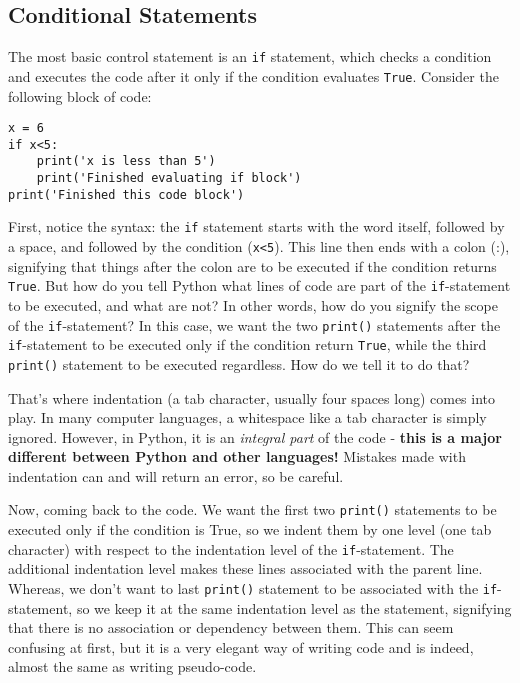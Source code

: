 \documentclass[12pt]{article}
\newcommand{\code}{\texttt}
\begin{document}
\subsection{Conditional Statements}
The most basic control statement is an \code{if} statement, which checks a condition and executes the code after it only if the condition evaluates \code{True}. Consider the following block of code:

\begin{lstlisting}[frame=single] 
x = 6
if x<5:
    print('x is less than 5')
    print('Finished evaluating if block')
print('Finished this code block')
\end{lstlisting}

First, notice the syntax: the \code{if} statement starts with the word itself, followed by a space, and followed by the condition (\code{x<5}). This line then ends with a colon (:), signifying that things after the colon are to be executed if the condition returns \code{True}. But how do you tell Python what lines of code are part of the \code{if}-statement to be executed, and what are not? In other words, how do you signify the scope of the \code{if}-statement? In this case, we want the two \code{print()} statements after the \code{if}-statement to be executed only if the condition return \code{True}, while the third \code{print()} statement to be executed regardless. How do we tell it to do that?

That's where indentation (a tab character, usually four spaces long) comes into play. In many computer languages, a whitespace like a tab character is simply ignored. However, in Python, it is an \textit{integral part} of the code - \textbf{this is a major different between Python and other languages!} Mistakes made with indentation can and will return an error, so be careful. 

Now, coming back to the code. We want the first two \code{print()} statements to be executed only if the condition is True, so we indent them by one level (one tab character) with respect to the indentation level of the \code{if}-statement. The additional indentation level makes these lines associated with the parent line. Whereas, we don't want to last \code{print()} statement to be associated with the \code{if}-statement, so we keep it at the same indentation level as the statement, signifying that there is no association or dependency between them. This can seem confusing at first, but it is a very elegant way of writing code and is indeed, almost the same as writing pseudo-code.
\end{document}

